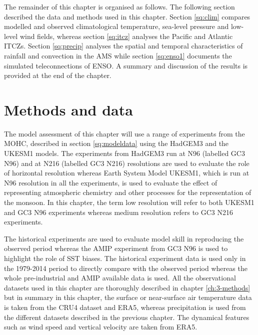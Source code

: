 The remainder of this chapter is organised as follows. The following section described the data and methods used in this chapter. Section  \ref{sq:clim} compares modelled and observed climatological temperature, sea-level pressure and low-level wind fields,  whereas section \ref{sq:itcz} analyses the Pacific and Atlantic ITCZs. Section \ref{sq:precip} analyses the spatial and temporal characteristics of rainfall and convection in the AMS while section \ref{sq:enso1} documents the simulated teleconnections of ENSO. A summary and discussion of the results is provided at the end of the chapter.

\section{Methods and data} 
\label{sq:meth_ch4}
The model assessment of this chapter will use a range of experiments from the MOHC, described in section \ref{sq:modeldata} using the HadGEM3 and the UKESM1 models. The experiments from HadGEM3 run at N96 (labelled GC3 N96) and at N216 (labelled GC3 N216) resolutions are used to evaluate the role of horizontal resolution whereas Earth System Model UKESM1, which is run at N96 resolution in all the experiments, is used to evaluate the effect of representing atmospheric chemistry and other processes for the representation of the monsoon. 
In this chapter, the term low resolution will refer to both UKESM1 and GC3 N96 experiments whereas medium resolution refers to GC3 N216 experiments.%

The historical experiments are used to evaluate model skill in reproducing the observed period whereas the AMIP experiment from GC3 N96 is used to highlight the role of SST biases. The historical experiment data is used only in the 1979-2014 period to directly compare with the observed period whereas the whole pre-industrial and AMIP available data is used. 
All the observational datasets used in this chapter are thoroughly described in chapter \ref{ch:3-methods} but in summary in this chapter, the surface or near-surface air temperature data is taken from the CRU4 dataset and ERA5, whereas precipitation is used from the different datasets described in the previous chapter. The dynamical features such as wind speed and vertical velocity are taken from ERA5.


